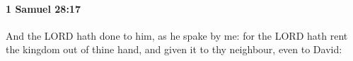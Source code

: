 
		\paragraph{1 Samuel 28:17} %
			\label{1SAMUEL-28-17}

			And the LORD hath done to him, as he spake by me: for the LORD hath rent the kingdom out of thine hand, and given it to thy neighbour, even to David:


